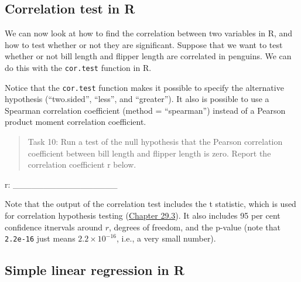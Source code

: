 \documentclass[
]{scrbook}
\newenvironment{Shaded}{\begin{snugshade}}{\end{snugshade}}
\newcommand{\AttributeTok}[1]{\textcolor[rgb]{0.77,0.63,0.00}{#1}}
\newcommand{\FunctionTok}[1]{\textcolor[rgb]{0.00,0.00,0.00}{#1}}
\newcommand{\NormalTok}[1]{#1}
\newcommand{\SpecialCharTok}[1]{\textcolor[rgb]{0.00,0.00,0.00}{#1}}
\newcommand{\StringTok}[1]{\textcolor[rgb]{0.31,0.60,0.02}{#1}}
\begin{document}
\hypertarget{correlation-test-in-r}{%
\subsection{Correlation test in R}\label{correlation-test-in-r}}

We can now look at how to find the correlation between two variables in R, and how to test whether or not they are significant.
Suppose that we want to test whether or not bill length and flipper length are correlated in penguins.
We can do this with the \texttt{cor.test} function in R.

\begin{Shaded}
\end{Shaded}

Notice that the \texttt{cor.test} function makes it possible to specify the alternative hypothesis (``two.sided'', ``less'', and ``greater'').
It also is possible to use a Spearman correlation coefficient (method = ``spearman'') instead of a Pearson product moment correlation coefficient.

\begin{quote}
Task 10: Run a test of the null hypothesis that the Pearson correlation coefficient between bill length and flipper length is zero. Report the correlation coefficient r below.
\end{quote}

r: \_\_\_\_\_\_\_\_\_\_\_\_\_\_\_\_\_

Note that the output of the correlation test includes the t statistic, which is used for correlation hypothesis testing (\protect\hyperlink{correlation-hypothesis-testing}{Chapter 29.3}).
It also includes 95 per cent confidence itnervals around \(r\), degrees of freedom, and the p-value (note that \texttt{2.2e-16} just means \(2.2 \times 10^{-16}\), i.e., a very small number).

\hypertarget{simple-linear-regression-in-r}{%
\subsection{Simple linear regression in R}\label{simple-linear-regression-in-r}}
\end{document}
